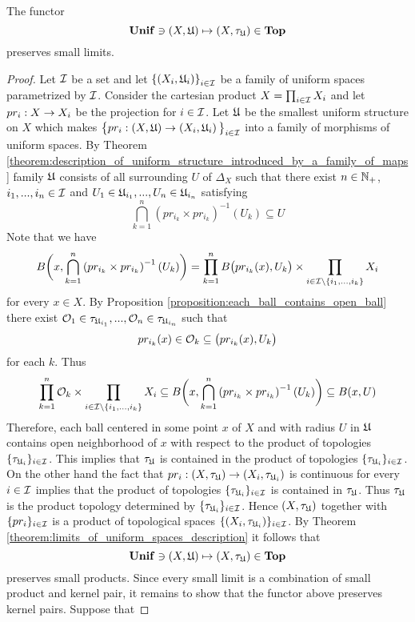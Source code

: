 \begin{theorem}\label{theorem:induced_topology_functor_preserves_limits_of_uniform_spaces}
The functor 
$$\mathbf{Unif} \ni (X,{\mathfrak U}) \mapsto (X,\tau_{{\mathfrak U}}) \in \mathbf{Top}$$
preserves small limits.
\end{theorem}
\begin{proof}
Let ${\mathcal I}$ be a set and let $\left\{\left(X_i,{\mathfrak U}_i\right)\right\}_{i\in {\mathcal I}}$ be a family of uniform spaces parametrized by ${\mathcal I}$. Consider the cartesian product $X = \prod_{i\in {\mathcal I}}X_i$ and let $pr_i:X\rightarrow X_i$ be the projection for $i\in {\mathcal I}$. Let ${\mathfrak U}$ be the smallest uniform structure on $X$ which makes $\big\{pr_i:\left(X,{\mathfrak U}\right) \rightarrow \left(X_i,{\mathfrak U}_i\right)\big\}_{i\in {\mathcal I}}$ into a family of morphisms of uniform spaces. By Theorem \ref{theorem:description_of_uniform_structure_introduced_by_a_family_of_maps} family ${\mathfrak U}$ consists of all surrounding $U$ of $\Delta_X$ such that there exist $n\in {\mathbb N}_+$, $i_1,...,i_n\in {\mathcal I}$ and $U_1 \in {\mathfrak U}_{i_1},...,U_n\in {\mathfrak U}_{i_n}$ satisfying
$$\bigcap_{k=1}^n\left(pr_{i_k}\times pr_{i_k}\right)^{-1}(U_k) \subseteq U$$
Note that we have
$$B\bigg(x, \bigcap_{k=1}^n\left(pr_{i_k}\times pr_{i_k}\right)^{-1}(U_k)\bigg) = \prod_{k=1}^nB\big(pr_{i_k}(x), U_k\big)\times \prod_{i\in {\mathcal I}\setminus \{i_1,...,i_k\}}X_i$$
for every $x \in X$. By Proposition \ref{proposition:each_ball_contains_open_ball} there exist ${\mathcal O}_1 \in \tau_{{\mathfrak U}_{i_1}},...,{\mathcal O}_n \in \tau_{{\mathfrak U}_{i_n}}$ such that 
$$pr_{i_k}(x) \in {\mathcal O}_k \subseteq \big(pr_{i_k}(x), U_k\big)$$
for each $k$. Thus
$$\prod_{k=1}^n{\mathcal O}_k \times \prod_{i\in {\mathcal I}\setminus \{i_1,...,i_k\}}X_i \subseteq B\bigg(x, \bigcap_{k=1}^n\left(pr_{i_k}\times pr_{i_k}\right)^{-1}(U_k)\bigg) \subseteq B(x,U)$$
Therefore, each ball centered in some point $x$ of $X$ and with radius $U$ in ${\mathfrak U}$ contains open neighborhood of $x$ with respect to the product of topologies $\{\tau_{{\mathfrak U}_i}\}_{i\in  {\mathcal I}}$. This implies that $\tau_{{\mathfrak U}}$ is contained in the product of topologies $\{\tau_{{\mathfrak U}_i}\}_{i\in  {\mathcal I}}$. On the other hand the fact that $pr_i:(X,\tau_{{\mathfrak U}}) \rightarrow (X_i,\tau_{{\mathfrak U}_i})$ is continuous for every $i\in {\mathcal I}$ implies that the product of topologies $\{\tau_{{\mathfrak U}_i}\}_{i\in {\mathcal I}}$ is contained in $\tau_{{\mathfrak U}}$. Thus $\tau_{{\mathfrak U}}$ is the product topology determined by $\{\tau_{{\mathfrak U}_i}\}_{i\in {\mathcal I}}$. Hence $(X,\tau_{{\mathfrak U}})$ together with $\{pr_i\}_{i\in {\mathcal I}}$ is a product of topological spaces $\{(X_i,\tau_{{\mathfrak U}_i})\}_{i\in {\mathcal I}}$. By Theorem \ref{theorem:limits_of_uniform_spaces_description} it follows that
$$\mathbf{Unif} \ni (X,{\mathfrak U}) \mapsto (X,\tau_{{\mathfrak U}}) \in \mathbf{Top}$$
preserves small products. Since every small limit is a combination of small product and kernel pair, it remains to show that the functor above preserves kernel pairs. Suppose that 

\end{proof}
